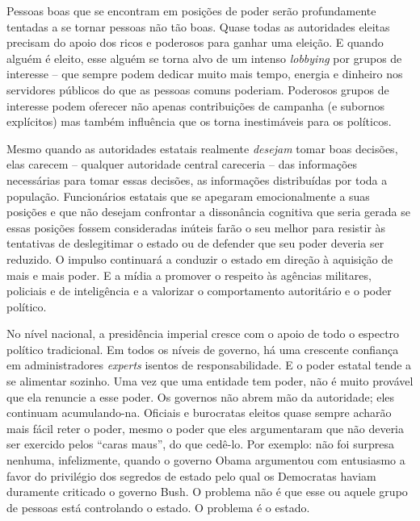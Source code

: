 Pessoas boas que se encontram em posições de poder serão profundamente tentadas a se tornar pessoas não tão boas. Quase todas as autoridades eleitas precisam do apoio dos ricos e poderosos para ganhar uma eleição. E quando alguém é eleito, esse alguém se torna alvo de um intenso \emph{lobbying} por grupos de interesse -- que sempre podem dedicar muito mais tempo, energia e dinheiro nos servidores públicos do que as pessoas comuns poderiam. Poderosos grupos de interesse podem oferecer não apenas contribuições de campanha (e subornos explícitos) mas também influência que os torna inestimáveis para os políticos.

Mesmo quando as autoridades estatais realmente \emph{desejam} tomar boas decisões, elas carecem -- qualquer autoridade central careceria -- das informações necessárias para tomar essas decisões, as informações distribuídas por toda a população. Funcionários estatais que se apegaram emocionalmente a suas posições e que não desejam confrontar a dissonância cognitiva que seria gerada se essas posições fossem consideradas inúteis farão o seu melhor para resistir às tentativas de deslegitimar o estado ou de defender que seu poder deveria ser reduzido. O impulso continuará a conduzir o estado em direção à aquisição de mais e mais poder. E a mídia a promover o respeito às agências militares, policiais e de inteligência e a valorizar o comportamento autoritário e o poder político.

No nível nacional, a presidência imperial cresce com o apoio de todo o espectro político tradicional. Em todos os níveis de governo, há uma crescente confiança em administradores \emph{experts} isentos de responsabilidade. E o poder estatal tende a se alimentar sozinho. Uma vez que uma entidade tem poder, não é muito provável que ela renuncie a esse poder. Os governos não abrem mão da autoridade; eles continuam acumulando-na. Oficiais e burocratas eleitos quase sempre acharão mais fácil reter o poder, mesmo o poder que eles argumentaram que não deveria ser exercido pelos ``caras maus'', do que cedê-lo. Por exemplo: não foi surpresa nenhuma, infelizmente, quando o governo Obama argumentou com entusiasmo a favor do privilégio dos segredos de estado pelo qual os Democratas haviam duramente criticado o governo Bush. O problema não é que esse ou aquele grupo de pessoas está controlando o estado. O problema é o estado.

